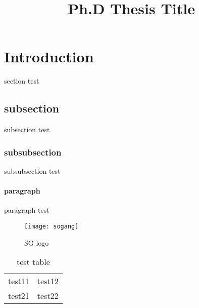 \documentclass[11pt,a4paper]{article}			%
\title{Ph.D Thesis Title} 						%
\begin{document}
\maketitle
\newpage
{}							%



\section{Introduction}
section test

\subsection{subsection}

subsection test

\subsubsection{subsubsection}

subsubsection test

\paragraph{paragraph}

paragraph test

\begin{figure}[htb]
\centering
\texttt{[image: sogang]}
\caption{SG logo}								%
\label{fig:sglogo}
\end{figure}


\begin{table}[htb]
\centering
\begin{tabular}{c|c}
test11 & test12 \\
test21 & test22
\end{tabular}
\caption{test table}							%
\label{tab:test}
\end{table}

\nocite{*}										%



\newpage										%
\end{document}
